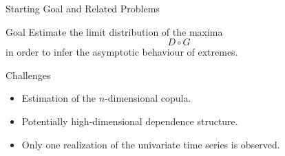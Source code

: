 \documentclass[10pt, aspectratio=169]{beamer}
\begin{document}
\begin{frame}{Starting Goal and Related Problems}

  \begin{block}{Goal}
  \vspace{0.1cm}
    Estimate the limit distribution of the maxima
    \[
    D \circ G
    \]
    in order to infer the asymptotic behaviour of extremes.
  \end{block}

  \vspace{0.5cm}

  \begin{alertblock}{Challenges}
  \begin{itemize}
      \item Estimation of the $n$-dimensional copula.
      \item Potentially high-dimensional dependence structure.
      \item Only one realization of the univariate time series is observed.
  \end{itemize}
  \end{alertblock}

\end{frame}
\end{document}
